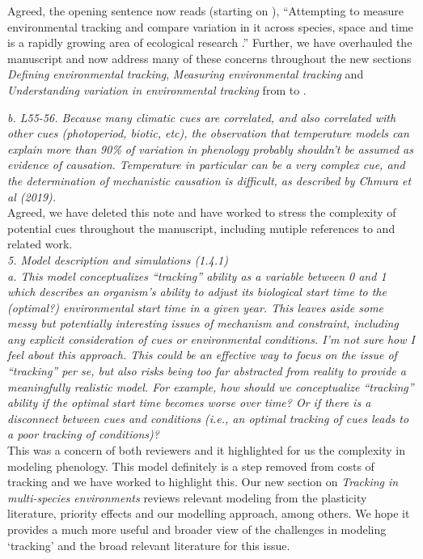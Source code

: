 \documentclass[11pt]{article}
\begin{document}
Agreed, the opening sentence now reads (starting on ), ``Attempting to measure environmental tracking and compare variation in it across species, space and time is a rapidly growing area of ecological research \citep[e.g.,]{Cook:2012pnas,fu2015,thackeray2016,cohen2018}.'' Further, we have overhauled the manuscript and now address many of these concerns throughout the new sections \emph{Defining environmental tracking}, \emph{Measuring environmental tracking} and \emph{Understanding variation in environmental tracking} from  to . 

\emph{b.      L55-56. Because many climatic cues are correlated, and also correlated with other
cues (photoperiod, biotic, etc), the observation that temperature models can explain more
than 90\% of variation in phenology probably shouldn't be assumed as evidence of causation.
Temperature in particular can be a very complex cue, and the determination of mechanistic
causation is difficult, as described by Chmura et al (2019).}\\

Agreed, we have deleted this note and have worked to stress the complexity of potential cues throughout the manuscript, including mutiple references to \citet{chmura2019} and related work.\\

\emph{5.      Model description and simulations (1.4.1)\\
a.      This model conceptualizes ``tracking'' ability as a variable between 0 and 1 which
describes an organism's ability to adjust its biological start time to the (optimal?)
environmental start time in a given year. This leaves aside some messy but potentially
interesting issues of mechanism and constraint, including any explicit consideration of cues
or environmental conditions. I'm not sure how I feel about this approach. This could be an
effective way to focus on the issue of ``tracking'' per se, but also risks being too far
abstracted from reality to provide a meaningfully realistic model. For example, how should we
conceptualize ``tracking'' ability if the optimal start time becomes worse over time? Or if
there is a disconnect between cues and conditions (i.e., an optimal tracking of cues leads to
a poor tracking of conditions)?}\\

This was a concern of both reviewers and it highlighted for us the complexity in modeling phenology. This model definitely is a step removed from costs of tracking and we have worked to highlight this. Our new section on \emph{Tracking in multi-species environments} reviews relevant modeling from the plasticity literature, priority effects and our modelling approach, among others. We hope it provides a much more useful and broader view of the challenges in modeling `tracking' and the broad relevant literature for this issue. \\ 
\end{document}
